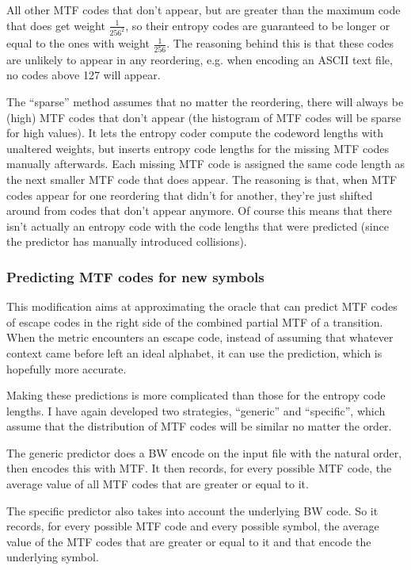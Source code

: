 \documentclass[a4paper]{scrreprt}
\begin{document}
All other MTF codes that don't appear, but are greater than the maximum code
that does get weight \(\frac{1}{256^2}\), so their entropy codes are guaranteed
to be longer or equal to the ones with weight \(\frac{1}{256}\). The reasoning
behind this is that these codes are unlikely to appear in any reordering, e.g.
when encoding an ASCII text file, no codes above 127 will appear.

The ``sparse'' method assumes that no matter the reordering, there will always
be (high) MTF codes that don't appear (the histogram of MTF codes will be
sparse for high values).
It lets the entropy coder compute the codeword lengths with unaltered weights,
but inserts entropy code lengths for the missing MTF codes manually afterwards.
Each missing MTF code is assigned the same code length as the next smaller MTF
code that does appear. The reasoning is that, when MTF codes appear for one
reordering that didn't for another, they're just shifted around from codes that
don't appear anymore. Of course this means that there isn't actually an entropy
code with the code lengths that were predicted (since the predictor has
manually introduced collisions).

\subsubsection{Predicting MTF codes for new symbols}

This modification aims at approximating the oracle that can predict MTF codes of
escape codes in the right side of the combined partial MTF of a transition. When
the metric encounters an escape code, instead of assuming that whatever
context came before left an ideal alphabet, it can use the prediction, which is
hopefully more accurate.

Making these predictions is more complicated than those for the entropy code
lengths. I have again developed two strategies, ``generic'' and ``specific'',
which assume that the distribution of MTF codes will be similar no matter the
order.

The generic predictor does a BW encode on the input file with the natural order,
then encodes this with MTF. It then records, for every possible MTF code, the
average value of all MTF codes that are greater or equal to it.

The specific predictor also takes into account the underlying BW code. So it
records, for every possible MTF code and every possible symbol, the average
value of the MTF codes that are greater or equal to it and that encode the
underlying symbol.
\end{document}
